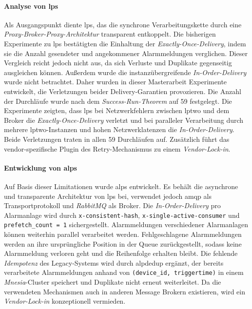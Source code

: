 \paragraph{Analyse von \gls{lps}} Als Ausgangspunkt diente \gls{lps}, das die synchrone Verarbeitungskette durch eine \textit{Proxy-Broker-Proxy-Architektur} transparent entkoppelt. Die bisherigen Experimente zu \gls{lps} bestätigten die Einhaltung der \textit{Exactly-Once-Delivery}, indem sie die Anzahl gesendeter und angekommener Alarmmeldungen verglichen. Dieser Vergleich reicht jedoch nicht aus, da sich Verluste und Duplikate gegenseitig ausgleichen können. Außerdem wurde die instanzübergreifende \textit{In-Order-Delivery} wurde nicht betrachtet. Daher wurden in dieser Masterarbeit Experimente entwickelt, die Verletzungen beider Delivery-Garantien provozieren. Die Anzahl der Durch\-läu\-fe wurde nach dem \textit{Success-Run-Theorem} auf 59 festgelegt. Die Experimente zeigten, dass \gls{lps} bei Netzwerkfehlern zwischen \gls{lptwo} und dem Broker die \textit{Exactly-Once-Delivery} verletzt und bei paralleler Verarbeitung durch mehrere \gls{lptwo}-Instanzen und hohen Netzwerklatenzen die \textit{In-Order-Delivery}. Beide Verletzungen traten in allen 59 Durch\-läu\-fen auf. Zusätzlich führt das vendor-spezifische Plugin des Retry-Mechanismus zu einem \textit{Vendor-Lock-in}.

\paragraph{Entwicklung von \gls{alps}} Auf Basis dieser Limitationen wurde \gls{alps} entwickelt. Es behält die asynchrone und transparente Architektur von \gls{lps} bei, verwendet jedoch \gls{amqp} als Transportprotokoll und \textit{RabbitMQ} als Broker. Die \textit{In-Order-Delivery} pro Alarmanlage wird durch \texttt{x-\allowbreak consistent-hash}, \texttt{x-\allowbreak single-active-consumer} und \texttt{prefetch\_count = 1} sichergestellt. Alarmmeldungen verschiedener Alarmanlagen können weiterhin parallel verarbeitet werden. Fehlgeschlagene Alarmmeldungen werden an ihre ursprüngliche Position in der Queue zurückgestellt, sodass keine Alarmmeldung verloren geht und die Reihenfolge erhalten bleibt. Die fehlende \textit{Idempotenz} des Legacy-Systems wird durch \gls{alpdedup} ergänzt, der bereits verarbeitete Alarmmeldungen anhand von \texttt{(device\_id, triggertime)} in einem \textit{Mnesia}-Cluster speichert und Duplikate nicht erneut weiterleitet. Da die verwendeten Mechanismen auch in anderen Message Brokern existieren, wird ein \textit{Vendor-Lock-in} konzeptionell vermieden.

